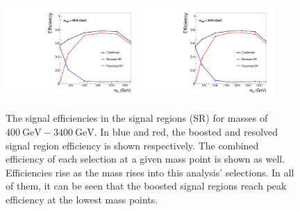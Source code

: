 \begin{figure}[htbp]
  \includegraphics[width=0.45\textwidth]{figures/SigEff/WR2800.pdf}
  \hspace{0.01\textwidth}
  \includegraphics[width=0.45\textwidth]{figures/SigEff/WR3400.pdf}

  \caption[Signal Efficiencies for -3400]{
    The signal efficiencies in the signal regions (SR) for \WR masses of \ensuremath{\SI{400}{\GeV}-\SI{3400}{\GeV}}. In blue and red, the boosted and resolved signal region efficiency is shown respectively. The combined efficiency of each selection at a given mass point is shown as well. Efficiencies rise as the \WR mass rises into this analysis' selections. In all of them, it can be seen that the boosted signal regions reach peak efficiency at the lowest \NR mass points.
  }
  \label{fig:SigEff1}
\end{figure}

